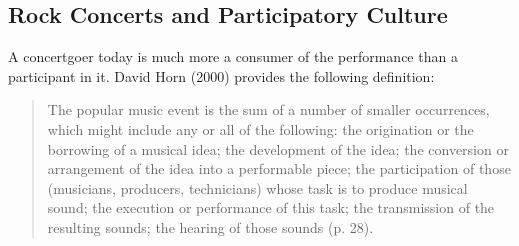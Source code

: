 \subsection{Rock Concerts and Participatory Culture}

A concertgoer today is much more a consumer of the performance than a participant in it. David Horn (2000) provides the following definition:

\begin{quotation}
\onehalfspacing	
The popular music event is the sum of a number of smaller occurrences, which might include any or all of the following: the origination or the borrowing of a musical idea; the development of the idea; the conversion or arrangement of the idea into a performable piece; the participation of those (musicians, producers, technicians) whose task is to produce musical sound; the execution or performance of this task; the transmission of the resulting sounds; the hearing of those sounds (p. 28).
\end{quotation}

